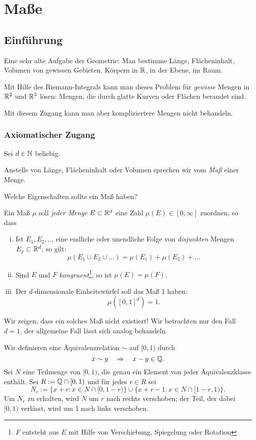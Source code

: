 \chapter{Maße}
\section{Einführung}
\begin{prgp}
 Eine sehr alte Aufgabe der Geometrie: Man bestimme Länge, Flächeninhalt, Volumen von gewissen Gebieten, Körpern in $\mathbb{R}$, in der Ebene, im Raum.
 
 Mit Hilfe des Riemann-Integrals kann man dieses Problem für \emph{gewisse} Mengen in $\mathbb{R}^2$ und $\mathbb{R}^3$ lösen: Mengen, die durch glatte Kurven oder Flächen berandet sind.
 
 Mit diesem Zugang kann man aber kompliziertere Mengen nicht behandeln.
\end{prgp}
 
\subsection*{Axiomatischer Zugang}
Sei $d \in \mathbb{N}$ beliebig. 

Anstelle von Länge, Flächeninhalt oder Volumen sprechen wir vom \emph{Maß} einer Menge.

Welche Eigenschaften sollte ein Maß haben?

Ein Maß $\mu$ soll \emph{jeder Menge} $E \subset \mathbb{R}^d$ eine Zahl $\mu(E) \in [0, \infty]$ zuordnen, so dass
\begin{enumerate}[(i)]
 \item Ist $E_1, E_2, \ldots$ eine endliche oder unendliche Folge von \emph{disjunkten} Mengen $E_j \subset \mathbb{R}^d$, so gilt:
 \[ \mu(E_1 \cup E_2 \cup \ldots ) = \mu(E_1) + \mu(E_2) + \ldots \]
 \item Sind $E$ und $F$ \emph{kongruent}\footnote{$F$ entsteht aus $E$ mit Hilfe von Verschiebung, Spiegelung oder Rotation}, so ist $\mu(E) = \mu(F)$.
 \item Der $d$-dimensionale Einheitswürfel soll das Maß 1 haben:
  \[ \mu([0,1]^d) = 1. \]
\end{enumerate}

Wir zeigen, dass ein solches Maß nicht existiert! Wir betrachten nur den Fall $d=1$, der allgemeine Fall lässt sich analog behandeln.

Wir definieren eine Äquivalenzrelation $\sim$ auf $[0,1)$ durch
\[ x \sim y \quad \Rightarrow \quad x-y \in \mathbb{Q}. \]
Sei $N$ eine Teilmenge von $[0,1)$, die genau ein Element von jeder Äquivalenzklasse enthält. Sei $R := \mathbb{Q} \cap [0,1)$ und für jedes $r \in R$ sei 
\[ N_r := \{ x + r: x \in N \cap [0,1-r) \} \cup \{ x + r - 1: x \in N \cap [1-r,1) \}. \]
Um $N_r$ zu erhalten, wird $N$ um $r$ nach rechts verschoben; der Teil, der dabei $[0,1)$ verlässt, wird um 1 nach links verschoben.

